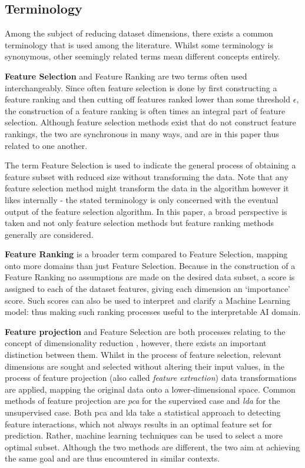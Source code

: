 \documentclass{article}
\begin{document}
\subsection{Terminology}
Among the subject of reducing dataset dimensions, there exists a common terminology that is used among the literature. Whilst some terminology is synonymous, other seemingly related terms mean different concepts entirely.

\textbf{Feature Selection} and Feature Ranking are two terms often used interchangeably. Since often feature selection is done by first constructing a feature ranking and then cutting off features ranked lower than some threshold $\epsilon$, the construction of a feature ranking is often times an integral part of feature selection. Although feature selection methods exist that do not construct feature rankings, the two are synchronous in many ways, and are in this paper thus related to one another.

The term Feature Selection is used to indicate the general process of obtaining a feature subset with reduced size without transforming the data. Note that any feature selection method might transform the data in the algorithm however it likes internally - the stated terminology is only concerned with the eventual output of the feature selection algorithm. In this paper, a broad perspective is taken and not only feature selection methods but feature ranking methods generally are considered.

\textbf{Feature Ranking} is a broader term compared to Feature Selection, mapping onto more domains than just Feature Selection. Because in the construction of a Feature Ranking no assumptions are made on the desired data subset, a score is assigned to each of the dataset features, giving each dimension an `importance' score. Such scores can also be used to interpret and clarify a Machine Learning model: thus making such ranking processes useful to the interpretable AI domain.

\textbf{Feature projection} and Feature Selection are both processes relating to the concept of dimensionality reduction \citep{cunningham_dimension_2007}, however, there exists an important distinction between them. Whilst in the process of feature selection, relevant dimensions are sought and selected without altering their input values, in the process of feature projection (also called \textit{feature extraction}) data transformations are applied, mapping the original data onto a lower-dimensional space. Common methods of feature projection are \textit{\gls{pca}} for the supervised case and \textit{\gls{lda}} for the unsupervised case. Both \gls{pca} and \gls{lda} take a statistical approach to detecting feature interactions, which not always results in an optimal feature set for prediction. Rather, machine learning techniques can be used to select a more optimal subset. Although the two methods are different, the two aim at achieving the same goal and are thus encountered in similar contexts.
\end{document}
